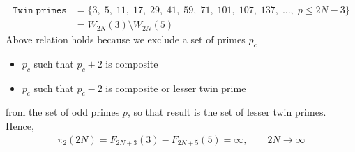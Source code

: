 \begin{align*}
    \mathtt{Twin \; primes} &= \{ 3, \; 5, \; 11, \; 17, \; 29, \; 41, \; 59, \; 71, \; 101, \; 107, \; 137, \; \dots, \;  p \leq 2N - 3 \} \\
    &= W_{2N}(3) \setminus W_{2N}(5)
\end{align*}
Above relation holds because we exclude a set of primes $p_c$
\begin{itemize}
    \item $p_c$ such that $p_c+2$ is composite
    \item $p_c$ such that $p_c-2$ is composite or lesser twin prime
\end{itemize}
from the set of odd primes $p$, so that result is the set of lesser twin primes.
Hence,
\begin{align*}
    \pi_2 (2N) = F_{2N+3}(3) - F_{2N+5}(5) = \infty, \quad \quad 2N \to \infty
\end{align*}
